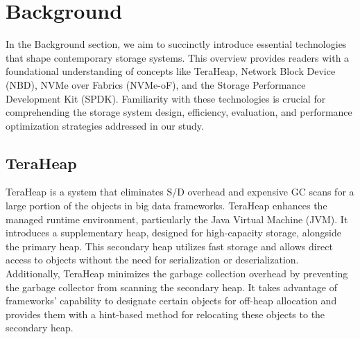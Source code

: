 \section{Background}

In the Background section, we aim to succinctly introduce essential technologies that shape contemporary storage systems. This overview provides readers with a foundational understanding of concepts like TeraHeap, Network Block Device (NBD), NVMe over Fabrics (NVMe-oF), and the Storage Performance Development Kit (SPDK). Familiarity with these technologies is crucial for comprehending the storage system design, efficiency, evaluation, and performance optimization strategies addressed in our study.
\vspace{1em}
\subsection{TeraHeap}
TeraHeap is a system that eliminates S/D overhead and expensive GC scans for a
large portion of the objects in big data frameworks. TeraHeap enhances the
managed runtime environment, particularly the Java Virtual Machine (JVM). It
introduces a supplementary heap, designed for high-capacity storage, alongside
the primary heap. This secondary heap utilizes fast storage and allows direct
access to objects without the need for serialization or deserialization.
Additionally, TeraHeap minimizes the garbage collection overhead by preventing
the garbage collector from scanning the secondary heap. It takes advantage of
frameworks' capability to designate certain objects for off-heap allocation and
provides them with a hint-based method for relocating these objects to the
secondary heap. 


